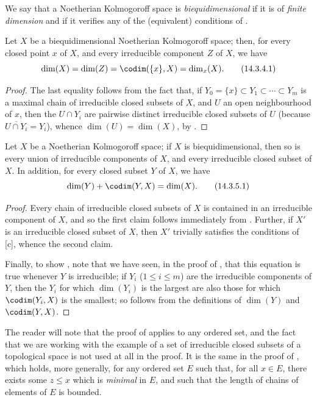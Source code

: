 We say that a Noetherian Kolmogoroff space is \emph{biequidimensional} if it is of \emph{finite dimension} and if it verifies any of the (equivalent) conditions of .

\begin{corollary}[14.3.4]
\label{0.14.3.4}
Let $X$ be a biequidimensional Noetherian Kolmogoroff space;
then, for every closed point $x$ of $X$, and every irreducible component $Z$ of $X$, we have
\[
\label{0.14.3.4.1}
  \dim(X)=\dim(Z)=\codim(\{x\},X)=\dim_x(X).
  \tag{14.3.4.1}
\]
\end{corollary}

\begin{proof}
The last equality follows from the fact that, if $Y_0=\{x\}\subset Y_1\subset\cdots\subset Y_m$ is a maximal chain of irreducible closed subsets of $X$, and $U$ an open neighbourhood of $x$, then the $U\cap Y_i$ are pairwise distinct irreducible closed subsets of $U$ (because $\overline{U\cap Y_i}=Y_i$), whence $\dim(U)=\dim(X)$, by .
\end{proof}

\begin{corollary}[14.3.5]
\label{0.14.3.5}
Let $X$ be a Noetherian Kolmogoroff space; if $X$ is biequidimensional, then so is every union of irreducible components of $X$, and every irreducible closed subset of $X$.
In addition, for every closed subset $Y$ of $X$, we have
\[
\label{0.14.3.5.1}
  \dim(Y)+\codim(Y,X)=\dim(X).
  \tag{14.3.5.1}
\]
\end{corollary}

\begin{proof}
Every chain of irreducible closed subsets of $X$ is contained in an irreducible component of $X$, and so the first claim follows immediately from .
Further, if $X'$ is an irreducible closed subset of $X$, then $X'$ trivially satisfies the conditions of [c], whence the second claim.

Finally, to show , note that we have seen, in the proof of , that this equation is true whenever $Y$ is irreducible;
if $Y_i$ ($1\leq i\leq m$) are the irreducible components of $Y$, then the $Y_i$ for which $\dim(Y_i)$ is the largest are also those for which $\codim(Y_i,X)$ is the smallest;
so  follows from the definitions of $\dim(Y)$ and $\codim(Y,X)$.
\end{proof}

\begin{remark}[14.3.6]
\label{0.14.3.6}
The reader will note that the proof of  applies to any ordered set, and the fact that we are working with the example of a set of irreducible closed subsets of a topological space is not used at all in the proof.
It is the same in the proof of , which holds, more generally, for any ordered set $E$ such that, for all $x\in E$, there exists some $z\leq x$ which is \emph{minimal} in $E$, and such that the length of chains of elements of $E$ is bounded.
\end{remark}
